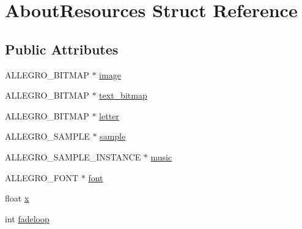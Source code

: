 \hypertarget{structAboutResources}{\section{About\+Resources Struct Reference}
\label{structAboutResources}
}
\subsection*{Public Attributes}
\begin{DoxyCompactItemize}
\item 
A\+L\+L\+E\+G\+R\+O\+\_\+\+B\+I\+T\+M\+A\+P $\ast$ \hyperlink{structAboutResources_aa30fff0623b2d19c66a1142ea02a44b0}{image}
\item 
A\+L\+L\+E\+G\+R\+O\+\_\+\+B\+I\+T\+M\+A\+P $\ast$ \hyperlink{structAboutResources_ab815d61a599147b4d69653c458b4c383}{text\+\_\+bitmap}
\item 
A\+L\+L\+E\+G\+R\+O\+\_\+\+B\+I\+T\+M\+A\+P $\ast$ \hyperlink{structAboutResources_afb1102473ef660c7cb27356953a18b06}{letter}
\item 
A\+L\+L\+E\+G\+R\+O\+\_\+\+S\+A\+M\+P\+L\+E $\ast$ \hyperlink{structAboutResources_a3dff2cf8b4e55a6d99af8492863d0a18}{sample}
\item 
A\+L\+L\+E\+G\+R\+O\+\_\+\+S\+A\+M\+P\+L\+E\+\_\+\+I\+N\+S\+T\+A\+N\+C\+E $\ast$ \hyperlink{structAboutResources_a0a619b203cf8996238e3a509a6396596}{music}
\item 
A\+L\+L\+E\+G\+R\+O\+\_\+\+F\+O\+N\+T $\ast$ \hyperlink{structAboutResources_a2cb6da4e10371ae03afe192e545cb587}{font}
\item 
float \hyperlink{structAboutResources_ae76f540590fc3891af877f9ffa5823c8}{x}
\item 
int \hyperlink{structAboutResources_ae8bf7fbfd5f03f8c5713b65c16922924}{fadeloop}
\end{DoxyCompactItemize}


